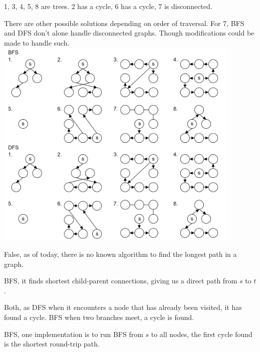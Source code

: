 \begin{Answer} 1, 3, 4, 5, 8 are trees. 2 has a cycle, 6 has a cycle, 7 is disconnected.
\end{Answer}
\begin{Answer} There are other possible solutions depending on order of traversal. For 7,
    BFS and DFS don't alone handle disconnected graphs. Though modifications could be made to handle such.
    \includegraphics[height=4in]{./Sections/graphs/dag/bfs_dfs.png}
\end{Answer}

\vspace{.5em}
\begin{Answer} False, as of today, there is no known algorithm to find the longest path in a graph.
\end{Answer}

\vspace{.5em}
\begin{Answer} BFS, it finds shortest child-parent connections, giving us a direct path from $s$ to $t$.
\end{Answer}

\vspace{.5em}
\begin{Answer} Both, as DFS when it encounters a node that has already been visited, it has found a cycle. BFS when two branches meet, a cycle is found.
\end{Answer}

\vspace{.5em}
\begin{Answer} BFS, one implementation is to run BFS from $s$ to all nodes, the first cycle found is the shortest round-trip path.
\end{Answer}


